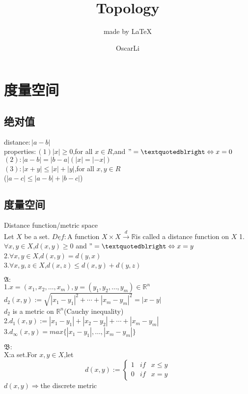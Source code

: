 \documentclass[cn,11pt,chinese,black]{elegantbook}
\title{Topology}
\subtitle{made by \LaTeX{} }
\author{OscarLi}
\institute{西南交大数学学院}
\begin{document}
\maketitle
\chapter{度量空间}
\section{绝对值}
\noindent distance$:|a-b|$ \\
properties$:(1)|x| \geq 0$,for all $x \in R$,and $"=” \Leftrightarrow x=0$\\
$(2):|a-b|=|b-a|(|x|=|-x|)$\\
$(3):|x+y| \leq |x|+|y|$,for all $x,y \in R$\\
($|a-c| \leq |a-b|+|b-c|$)
\section{度量空间}
\noindent Distance function/metric space\\
Let $X$ be a set.
$\underline{Def:}$A function $X \times X \stackrel{d}{\longrightarrow}\mathbb{R}$is called a distance function on $X$
1.$\forall x,y\in X$,$d(x,y)\geq 0$ and $"=” \Leftrightarrow x=y$\\
2.$\forall x,y\in X$,$d(x,y)=d(y,x)$\\
3.$\forall x,y,z \in X$,$d(x,z)\leq d(x,y)+d(y,z)$\\
\begin{example}
$\mathfrak{A}:$ \\
1.$x=(x_1,x_2,\dots,x_m),y=(y_1,y_2,\dots,y_m)\in \mathbb{R}^n$\\
$d_2(x,y):=\sqrt{|x_1-y_1|^2+\cdots+|x_m-y_m|^2}=|x-y|$ \\
$d_2$ is a metric on $\mathbb{R}^n$(Cauchy inequality)\\
2.$d_1(x,y):=|x_1-y_1|+|x_2-y_2|+\cdots+|x_m-y_m|$\\
3.$d_{\infty}(x,y)=max\{|x_1-y_1|,\dots,|x_m-y_m|\}$
\end{example}
\begin{example}
$\mathfrak{B}:$ \\
X:a set.For $x,y \in X$,let $$d(x,y):=\left\{
\begin{aligned}
1&if&x\leq y
\\
0&if&x =y
\end{aligned}
\right.
$$ 
$d(x,y)\Rightarrow$the discrete metric
\end{example}
\end{document}
